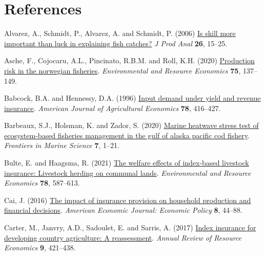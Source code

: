 \documentclass[
  letterpaper,
  DIV=11,
  numbers=noendperiod]{scrartcl}
\newlength{\cslhangindent}
\newlength{\cslentryspacingunit} %
\newenvironment{CSLReferences}[2] %
 {%
  \setlength{\parindent}{0pt}
  \ifodd #1
  \let\oldpar\par
  \def\par{\hangindent=\cslhangindent\oldpar}
  \fi
  \setlength{\parskip}{#2\cslentryspacingunit}
 }%
 {}
\theoremstyle{plain}
\theoremstyle{plain}
\theoremstyle{remark}
\begin{document}
\hypertarget{references}{%
\section*{References}\label{references}}

\hypertarget{refs}{}
\begin{CSLReferences}{1}{0}
\leavevmode{}%
Alvarez, A., Schmidt, P., Alvarez, A. and Schmidt, P. (2006)
\href{https://doi.org/10.1007/s11123-006-0002-x}{Is skill more important
than luck in explaining fish catches?} \emph{J Prod Anal} \textbf{26},
15--25.

\leavevmode{}%
Asche, F., Cojocaru, A.L., Pincinato, R.B.M. and Roll, K.H. (2020)
\href{https://doi.org/10.1007/s10640-019-00391-2}{Production risk in the
norwegian fisheries}. \emph{Environmental and Resource Economics}
\textbf{75}, 137--149.

\leavevmode{}%
Babcock, B.A. and Hennessy, D.A. (1996)
\href{https://doi.org/10.2307/1243713}{Input demand under yield and
revenue insurance}. \emph{American Journal of Agricultural Economics}
\textbf{78}, 416--427.

\leavevmode{}%
Barbeaux, S.J., Holsman, K. and Zador, S. (2020)
\href{https://doi.org/10.3389/fmars.2020.00703}{Marine heatwave stress
test of ecosystem-based fisheries management in the gulf of alaska
pacific cod fishery}. \emph{Frontiers in Marine Science} \textbf{7},
1--21.

\leavevmode{}%
Bulte, E. and Haagsma, R. (2021)
\href{https://doi.org/10.1007/s10640-021-00545-1}{The welfare effects of
index-based livestock insurance: Livestock herding on communal lands}.
\emph{Environmental and Resource Economics} \textbf{78}, 587--613.

\leavevmode{}%
Cai, J. (2016) \href{https://doi.org/10.1257/pol.20130371}{The impact of
insurance provision on household production and financial decisions}.
\emph{American Economic Journal: Economic Policy} \textbf{8}, 44--88.

\leavevmode{}%
Carter, M., Janvry, A.D., Sadoulet, E. and Sarris, A. (2017)
\href{https://doi.org/10.1146/annurev-resource-100516-053352}{Index
insurance for developing country agriculture: A reassessment}.
\emph{Annual Review of Resource Economics} \textbf{9}, 421--438.


\end{CSLReferences}
\end{document}
